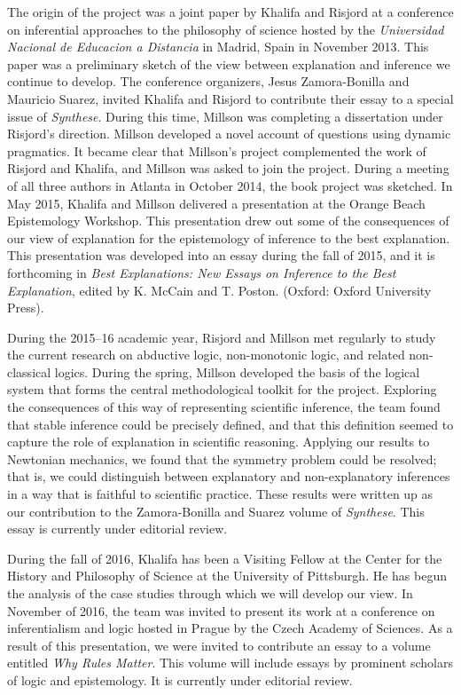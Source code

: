 \documentclass{article}[11pt]
\begin{document}
The origin of the project was a joint paper by Khalifa and Risjord at a conference on inferential approaches to the philosophy of science hosted by the \textit{Universidad Nacional de Educacion a Distancia} in Madrid, Spain in November 2013. This paper was a preliminary sketch of the view between explanation and inference we continue to develop. The conference organizers, Jesus Zamora-Bonilla and Mauricio Suarez, invited Khalifa and Risjord to contribute their essay to a special issue of \textit{Synthese}. During this time, Millson was completing a dissertation under Risjord's direction. Millson developed a novel account of questions using dynamic pragmatics. It became clear that Millson's project complemented the work of Risjord and Khalifa, and Millson was asked to join the project. During a meeting of all three authors in Atlanta in October 2014, the book project was sketched. In May 2015, Khalifa and Millson delivered a presentation at the Orange Beach Epistemology Workshop. This presentation drew out some of the consequences of our view of explanation for the epistemology of inference to the best explanation. This presentation was developed into an essay during the fall of 2015, and it is forthcoming in \textit{Best Explanations: New Essays on Inference to the Best Explanation}, edited by K. McCain and T. Poston. (Oxford: Oxford University Press). 

During the 2015--16 academic year, Risjord and Millson met regularly to study the current research on abductive logic, non-monotonic logic, and related non-classical logics.  During the spring, Millson developed the basis of the logical system that forms the central methodological toolkit for the project.   Exploring the consequences of this way of representing scientific inference, the team found that stable inference could be precisely defined, and that this definition seemed to capture the role of explanation in scientific reasoning.  Applying our results to Newtonian mechanics, we found that the symmetry problem could be resolved; that is, we could distinguish between explanatory and non-explanatory inferences in a way that is faithful to scientific practice.  These results were written up as our contribution to the Zamora-Bonilla and Suarez volume of \textit{Synthese}.  This essay is currently under editorial review.

During the fall of 2016, Khalifa has been a Visiting Fellow at the Center for the History and Philosophy of Science at the University of Pittsburgh.  He has begun the analysis of the case studies through which we will develop our view.  In November of 2016, the team was invited to present its work at a conference on inferentialism and logic hosted in Prague by the Czech Academy of Sciences.  As a result of this presentation, we were invited to contribute an essay to a volume entitled \textit{Why Rules Matter}.  This volume will include essays by prominent scholars of logic and epistemology.  It is currently under editorial review.
\end{document}
